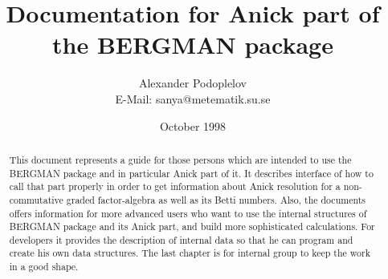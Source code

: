 \documentclass[a4paper,11pt]{article}
\title{Documentation for Anick part of the BERGMAN package}
\author{Alexander Podoplelov \\ \scriptsize{E-Mail: sanya@metematik.su.se}}
\date{October 1998}
\begin{document}
\maketitle

\begin{abstract}
  This document represents a guide for those persons which are intended
  to use the BERGMAN package and in particular Anick part of it. It describes
  interface of how to call that part properly in order to get information
  about Anick resolution for a non-commutative graded factor-algebra as well
  as its Betti numbers. Also, the documents offers information for more
  advanced users who want to use the internal structures of BERGMAN package
  and its Anick part, and build more sophisticated calculations. For developers
  it provides the description of internal data so that he can program and
  create his own data structures.
  The last chapter is for internal group to keep the work in a good shape.
\end{abstract}

\tableofcontents

\end{document}
